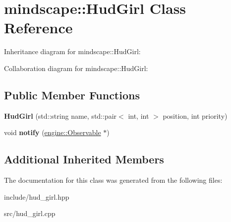 \hypertarget{classmindscape_1_1_hud_girl}{}\section{mindscape\+:\+:Hud\+Girl Class Reference}
\label{classmindscape_1_1_hud_girl}


Inheritance diagram for mindscape\+:\+:Hud\+Girl\+:


Collaboration diagram for mindscape\+:\+:Hud\+Girl\+:
\subsection*{Public Member Functions}
\begin{DoxyCompactItemize}
\item 
{\bfseries Hud\+Girl} (std\+::string name, std\+::pair$<$ int, int $>$ position, int priority)\hypertarget{classmindscape_1_1_hud_girl_a71122f6851e5be3bf3cd53647ba61ee4}{}\label{classmindscape_1_1_hud_girl_a71122f6851e5be3bf3cd53647ba61ee4}

\item 
void {\bfseries notify} (\hyperlink{classengine_1_1_observable}{engine\+::\+Observable} $\ast$)\hypertarget{classmindscape_1_1_hud_girl_aab26eccf3b4c726074174e34ffac817e}{}\label{classmindscape_1_1_hud_girl_aab26eccf3b4c726074174e34ffac817e}

\end{DoxyCompactItemize}
\subsection*{Additional Inherited Members}


The documentation for this class was generated from the following files\+:\begin{DoxyCompactItemize}
\item 
include/hud\+\_\+girl.\+hpp\item 
src/hud\+\_\+girl.\+cpp\end{DoxyCompactItemize}
